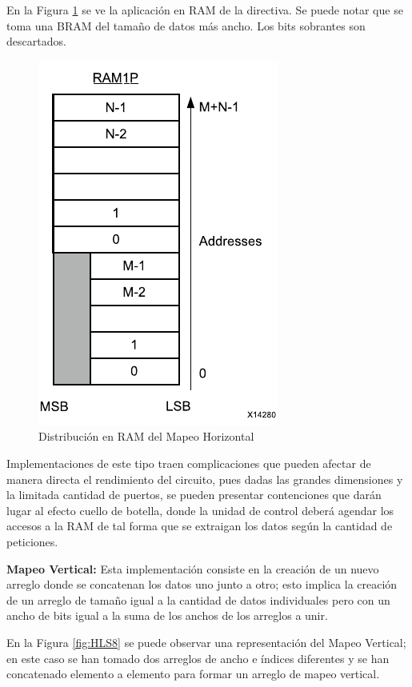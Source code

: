 En la Figura \ref{fig:HLS10} se ve la aplicación en RAM de la directiva. Se puede notar que se toma una BRAM del tamaño de datos más ancho. Los bits sobrantes son descartados.

\begin{figure}[H]
	\centering
		\includegraphics[scale=0.8]{./Figures/HLS10.pdf}
	\caption{Distribución en RAM del Mapeo Horizontal \citep{HLS2015}}
	\label{fig:HLS10}
\end{figure}

Implementaciones de este tipo traen complicaciones que pueden afectar de manera directa el rendimiento del circuito, pues dadas las grandes dimensiones y la limitada cantidad de puertos, se pueden presentar contenciones que darán lugar al efecto cuello de botella, donde la unidad de control deberá agendar los accesos a la RAM de tal forma que se extraigan los datos según la cantidad de peticiones.

\textbf{Mapeo Vertical:} Esta implementación consiste en la creación de un nuevo arreglo donde se concatenan los datos uno junto a otro; esto implica la creación de un arreglo de tamaño igual a la cantidad de datos individuales pero con un ancho de bits igual a la suma de los anchos de los arreglos a unir.

En la Figura \ref{fig:HLS8} se puede observar una representación del Mapeo Vertical; en este caso se han tomado dos arreglos de ancho e índices diferentes y se han concatenado elemento a elemento para formar un arreglo de mapeo vertical.

